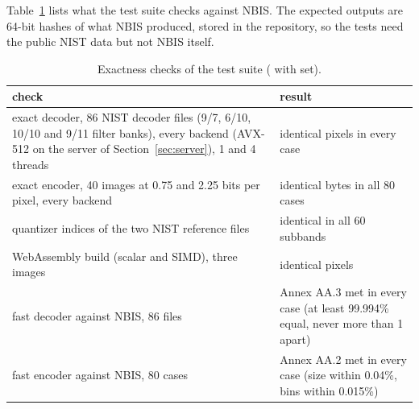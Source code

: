 Table~\ref{tab:verification} lists what the test suite checks against NBIS. The expected outputs
are 64-bit hashes of what NBIS produced, stored in the repository, so the tests need the public
NIST data but not NBIS itself.

\begin{table}[ht]
  \centering\small
  \begin{tabular}{@{}p{7.4cm}p{6.4cm}@{}}
    \toprule
    check & result \\
    \midrule
    exact decoder, 86 NIST decoder files (9/7, 6/10, 10/10 and 9/11 filter banks), every
    backend (AVX-512 on the server of Section~\ref{sec:server}), 1 and 4 threads & identical pixels in every case \\
    exact encoder, 40 images at 0.75 and 2.25 bits per pixel, every backend & identical bytes in all 80 cases \\
    quantizer indices of the two NIST reference files & identical in all 60 subbands \\
    WebAssembly build (scalar and SIMD), three images & identical pixels \\
    fast decoder against NBIS, 86 files & Annex AA.3 met in every case (at least 99.994\% equal, never more than 1 apart) \\
    fast encoder against NBIS, 80 cases & Annex AA.2 met in every case (size within 0.04\%, bins within 0.015\%) \\
    \bottomrule
  \end{tabular}
  \caption{Exactness checks of the test suite ( with  set).}
  \label{tab:verification}
\end{table}
